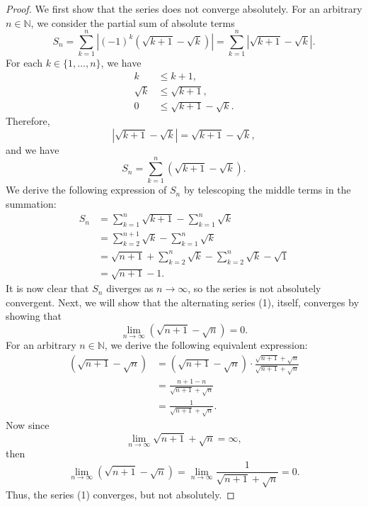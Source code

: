 \documentclass[12pt]{article}
\newcommand{\N}{\mathbb{N}} %
\newcommand{\<}{\left\langle} %
\renewcommand{\>}{\right\rangle} %
\begin{document}
\begin{proof}
    We first show that the series does not converge absolutely. For an arbitrary $n \in \N$, we consider the partial sum of absolute terms
    \[S_n = \sum_{k=1}^n \left| (-1)^k (\sqrt{k+1} - \sqrt{k}) \right| = \sum_{k=1}^n \left| \sqrt{k+1} - \sqrt{k} \right|.\]
    For each $k \in \{1, \dots, n\}$, we have
    \begin{align*}
        k &\leq k + 1, \\
        \sqrt{k} &\leq \sqrt{k + 1}, \\
        0 & \leq \sqrt{k + 1} - \sqrt{k}.
    \end{align*}
    Therefore,
    \[\left| \sqrt{k+1} - \sqrt{k} \right| = \sqrt{k+1} - \sqrt{k},\]
    and we have
    \[S_n = \sum_{k=1}^n \left( \sqrt{k+1} - \sqrt{k} \right).\]
    We derive the following expression of $S_n$ by telescoping the middle terms in the summation:
    \begin{align*}
        S_n
            &= \sum_{k=1}^n \sqrt{k+1} - \sum_{k=1}^n \sqrt{k} \\
            &= \sum_{k=2}^{n + 1} \sqrt{k} - \sum_{k=1}^n \sqrt{k} \\
            &= \sqrt{n + 1} + \sum_{k=2}^n \sqrt{k} - \sum_{k=2}^n \sqrt{k} - \sqrt{1} \\
            &= \sqrt{n + 1} - 1.
    \end{align*}
    It is now clear that $S_n$ diverges as $n \to \infty$, so the series is not absolutely convergent. Next, we will show that the alternating series (1), itself, converges by showing that
    \[\lim_{n \to \infty} \left( \sqrt{n+1} - \sqrt{n} \right) = 0.\]
    For an arbitrary $n \in \N$, we derive the following equivalent expression:
    \begin{align*}
        \left( \sqrt{n+1} - \sqrt{n} \right)
            &= \left( \sqrt{n+1} - \sqrt{n} \right) \cdot \frac{\sqrt{n+1} + \sqrt{n}}{\sqrt{n+1} + \sqrt{n}} \\
            &= \frac{n + 1 - n}{\sqrt{n+1} + \sqrt{n}} \\
            &= \frac{1}{\sqrt{n+1} + \sqrt{n}}.
    \end{align*}
    Now since
    \[\lim_{n \to \infty} \sqrt{n+1} + \sqrt{n} = \infty,\]
    then
    \[\lim_{n \to \infty} \left( \sqrt{n+1} - \sqrt{n} \right) = \lim_{n \to \infty} \frac{1}{\sqrt{n+1} + \sqrt{n}} = 0.\]
    Thus, the series (1) converges, but not absolutely. 
    
\end{proof}
\end{document}
